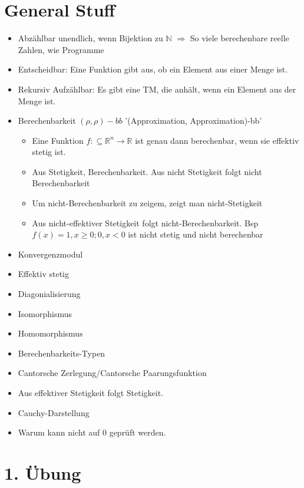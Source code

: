 \documentclass[ngerman]{scrartcl}
\begin{document}
%
%
%
%
\section{General Stuff}
\begin{itemize}
  \item Abzählbar unendlich, wenn Bijektion zu $ \mathbb{N} $ $ \Rightarrow $ So viele berechenbare reelle Zahlen, wie Programme
  \item Entscheidbar: Eine Funktion gibt aus, ob ein Element aus einer Menge ist.
  \item Rekursiv Aufzählbar: Es gibt eine TM, die anhält, wenn ein Element aus der Menge ist.
  \item Berechenbarkeit $ (\rho, \rho)-bb $ '(Approximation, Approximation)-bb'
  \begin{itemize}
    \item Eine Funktion $ f: \subseteq \mathbb{R}^n \rightarrow \mathbb{R} $ ist genau dann berechenbar, wenn sie effektiv stetig ist.
    \item Aus Stetigkeit, Berechenbarkeit. Aus nicht Stetigkeit folgt nicht Berechenbarkeit
    \item Um nicht-Berechenbarkeit zu zeigem, zeigt man nicht-Stetigkeit 
    \item Aus nicht-effektiver Stetigkeit folgt nicht-Berechenbarkeit. Bsp $  f(x) = 1, x \geq 0; 0, x < 0 $ ist nicht stetig und nicht berechenbar
  \end{itemize}
  \item Konvergenzmodul
  \item Effektiv stetig
  \item Diagonialisierung
  \item Isomorphismus
  \item Homomorphismus
  \item Berechenbarkeits-Typen
  \item Cantorsche Zerlegung/Cantorsche Paarungsfunktion
  \item Aus effektiver Stetigkeit folgt Stetigkeit. 
  \item Cauchy-Darstellung
  \item Warum kann nicht auf 0 geprüft werden.
\end{itemize}


\section{1. Übung}
\end{document}
